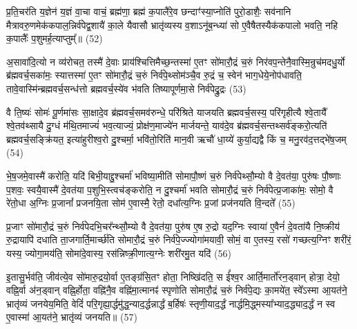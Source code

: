 प्र॒ति॒चर॑ति य॒ज्ञेन॑ य॒ज्ञं वा॒चा वाचं॒ ब्रह्म॑णा॒ ब्रह्म॑ क॒पालै॑रे॒व छन्दाꣳ॑स्या॒प्नोति॑ पुरो॒डाशैः॒ सव॑नानि मैत्रावरु॒णमेक॑कपाल॒न्निर्व॑पेद्व॒शायै॑ का॒ले यैवासौ भ्रातृ॑व्यस्य व॒शा\-ऽनू॑ब॒न्ध्या॑ सो ए॒वैषैतस्यैक॑कपालो भवति॒ नहि क॒पालैः᳚ प॒शुमर्\mbox{}ह॒त्याप्तुम्᳚॥ (52)

{\anuvakamend[{ब्रह्म॑णै॒वैन॑म॒भिच॑रति य॒ज्ञो न तावे॒वास्ये᳚न्द्रि॒यमा᳚प्नोति दे॒वताः᳚ स॒प्तत्रिꣳ॑शच्च।9।}]}

अ॒सावा॑दि॒त्यो न व्य॑रोचत॒ तस्मै॑ दे॒वाः प्राय॑श्चित्तिमैच्छ॒न्तस्मा॑ ए॒तꣳ सो॑मारौ॒द्रं च॒रुं निर॑वप॒न्तेनै॒वास्मि॒न्रुच॑मदधु॒र्यो ब्र॑ह्मवर्च॒सका॑मः॒ स्यात्तस्मा॑ ए॒तꣳ सो॑मारौ॒द्रं च॒रुं निर्व॑पे॒थ्सोम॑ञ्चै॒व रु॒द्रं च॒ स्वेन॑ भाग॒धेये॒नोप॑धावति॒ तावे॒वास्मि॑न्ब्रह्मवर्च॒सन्ध॑त्तो ब्रह्मवर्च॒स्ये॑व भ॑वति तिष्यापूर्णमा॒से निर्व॑पेद्रु॒द्रः (53)

वै ति॒ष्यः॑ सोमः॑ पू॒र्णमा॑सः सा॒क्षादे॒व ब्र॑ह्मवर्च॒समव॑रुन्धे॒ परि॑श्रिते याजयति ब्रह्मवर्च॒सस्य॒ परि॑गृहीत्यै श्वे॒तायै᳚ श्वे॒तव॑थ्सायै दु॒ग्धं म॑थि॒तमाज्यं॑ भव॒त्याज्यं॒ प्रोक्ष॑ण॒माज्ये॑न मार्जयन्ते॒ याव॑दे॒व ब्र॑ह्मवर्च॒सन्तथ्सर्व॑ङ्करो॒त्यति॑ ब्रह्मवर्च॒सङ्क्रि॑यत॒ इत्या॑हुरीश्व॒रो दु॒श्चर्मा॒ भवि॑तो॒रिति॑ मान॒वी ऋचौ॑ धा॒य्ये॑ कुर्या॒द्यद्वै किं च॒ मनु॒रव॑द॒त्तद्भे॑ष॒जम् (54)

भे॒ष॒जमे॒वास्मै॑ करोति॒ यदि॑ बिभी॒याद्दु॒श्चर्मा॑ भविष्या॒मीति॑ सोमापौ॒ष्णं च॒रुं निर्व॑पेथ्सौ॒म्यो वै दे॒वत॑या॒ पुरु॑षः पौ॒ष्णाः प॒शवः॒ स्वयै॒वास्मै॑ दे॒वत॑या प॒शुभि॒स्त्वच॑ङ्करोति॒ न दु॒श्चर्मा॑ भवति सोमारौ॒द्रं च॒रुं निर्व॑पेत्प्र॒जाका॑मः॒ सोमो॒ वै रे॑तो॒धा अ॒ग्निः प्र॒जानां᳚ प्रजनयि॒ता सोम॑ ए॒वास्मै॒ रेतो॒ दधा᳚त्य॒ग्निः प्र॒जां प्रज॑नयति वि॒न्दते᳚ (55)

प्र॒जाꣳ सो॑मारौ॒द्रं च॒रुं निर्व॑पेदभि॒चर᳚न्थ्सौ॒म्यो वै दे॒वत॑या॒ पुरु॑ष ए॒ष रु॒द्रो यद॒ग्निः स्वाया॑ ए॒वैनं॑ दे॒वता॑यै नि॒ष्क्रीय॑ रु॒द्रायापि॑ दधाति ता॒जगार्ति॒मार्च्छ॑ति सोमारौ॒द्रं च॒रुं निर्व॑पे॒ज्ज्योगा॑मयावी॒ सोमं॒ वा ए॒तस्य॒ रसो॑ गच्छत्य॒ग्निꣳ शरी॑रं॒ यस्य॒ ज्योगा॒मय॑ति॒ सोमा॑दे॒वास्य॒ रस॑न्निष्क्री॒णात्य॒ग्नेः शरी॑रमु॒त यदि॑ (56)

इ॒तासु॒र्भव॑ति॒ जीव॑त्ये॒व सो॑मारु॒द्रयो॒र्वा ए॒तङ्ग्र॑सि॒तꣳ होता॒ निष्खि॑दति॒ स ई᳚श्व॒र आर्ति॒मार्तो॑रन॒ड्वान् होत्रा॒ देयो॒ वह्नि॒र्वा अ॑न॒ड्वान् वह्नि॒र्\mbox{}होता॒ वह्नि॑नै॒व वह्नि॑मा॒त्मानꣴ॑ स्पृणोति सोमारौ॒द्रं च॒रुं निर्व॑पे॒द्यः का॒मये॑त॒ स्वे᳚\-ऽस्मा आ॒यत॑ने॒ भ्रातृ॑व्यं जनयेय॒मिति॒ वेदिं॑ परि॒गृह्या॒र्द्धमु॑द्ध॒न्याद॒र्द्धन्नार्द्धं ब॒र्\mbox{}हिषः॑ स्तृणी॒याद॒र्द्धं नार्द्धमि॒द्ध्मस्या᳚भ्याद॒द्ध्याद॒र्द्धं न स्व ए॒वास्मा॑ आ॒यत॑ने॒ भ्रातृ॑व्यं जनयति॥ (57)

